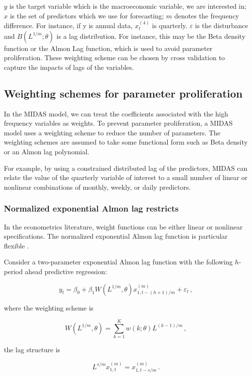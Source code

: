 $y$ is the target variable which is the macroeconomic variable, we are interested in; $x$ is the set of predictors which we use for forecasting; $m$ denotes the frequency difference. For instance, if y is annual data,  $x_t^{(4)}$ is quarterly. $\varepsilon$ is the disturbance and $B(L^{1/m};\theta)$ is a lag distribution. For instance, this may be the Beta density function or the Almon Lag function, which is used to avoid parameter proliferation. These weighting scheme can be chosen by cross validation to capture the impacts of lags of the variables. 




\subsection{Weighting schemes for parameter proliferation}

In the MIDAS model, we can treat the coefficients associated with the high frequency variables as weights. To prevent parameter proliferation, a MIDAS model uses a weighting scheme to reduce the number of parameters. The weighting schemes are assumed to take some functional form such as Beta density or an Almon lag polynomial. 

For example, by using a constrained distributed lag of the predictors, MIDAS can relate the value of the quarterly variable of interest to a small number of linear or nonlinear combinations of monthly, weekly, or daily predictors. 


\subsubsection{Normalized exponential Almon lag restricts}

In the econometrics literature, weight functions can be either linear or nonlinear specifications. The normalized exponential Almon lag function is particular flexible \cite{Ghysels2007}.

Consider a two-parameter exponential Almon lag function with the following $h$-period ahead predictive regression:

$$y_t=\beta_0 +  \beta_1 W( L^{1/m}, \theta)  x_{1, t-(h+1)/m}^{(m)}+\varepsilon_t \, ,$$

where the weighting scheme is

$$W(L^{1/m}, \theta) = \sum_{k=1}^K w(k;\theta) L^{(k-1)/m} \, ,$$

the lag structure is

$$L^{s/m} x_{1, t}^{(m)} = x_{1, t-s/m}^{(m)} \, .$$


